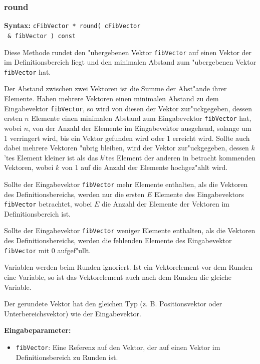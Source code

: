 \subsubsection{round}

\textbf{Syntax:} \verb|cFibVector * round( cFibVector| \\\verb| & fibVector ) const|

\bigskip\noindent
Diese Methode rundet den "ubergebenen Vektor \verb|fibVector| auf einen Vektor der im Definitionsbereich liegt und den minimalen Abstand zum "ubergebenen Vektor \verb|fibVector| hat.

Der Abstand zwischen zwei Vektoren ist die Summe der Abst"ande ihrer Elemente. Haben mehrere Vektoren einen minimalen Abstand zu dem Eingabevektor \verb|fibVector|, so wird von diesen der Vektor zur"uckgegeben, dessen ersten $n$ Elemente einen minimalen Abstand zum Eingabevektor \verb|fibVector| hat, wobei $n$, von der Anzahl der Elemente im Eingabevektor ausgehend, solange um 1 verringert wird, bis ein Vektor gefunden wird oder 1 erreicht wird. Sollte auch dabei mehrere Vektoren "ubrig bleiben, wird der Vektor zur"uckgegeben, dessen $k$'tes Element kleiner ist als das $k$'tes Element der anderen in betracht kommenden Vektoren, wobei $k$ von 1 auf die Anzahl der Elemente hochgez"ahlt wird.

Sollte der Eingabevektor \verb|fibVector| mehr Elemente enthalten, als die Vektoren des Definitionsbereichs, werden nur die ersten $E$ Elemente des Eingabevektors \verb|fibVector| betrachtet, wobei $E$ die Anzahl der Elemente der Vektoren im Definitionsbereich ist.

Sollte der Eingabevektor \verb|fibVector| weniger Elemente enthalten, als die Vektoren des Definitionsbereichs, werden die fehlenden Elemente des Eingabevektor \verb|fibVector| mit $0$ aufgef"ullt.

Variablen werden beim Runden ignoriert. Ist ein Vektorelement vor dem Runden eine Variable, so ist das Vektorelement auch nach dem Runden die gleiche Variable.

Der gerundete Vektor hat den gleichen Typ (z. B. Positionsvektor oder Unterbereichsvektor) wie der Eingabevektor.

\bigskip\noindent
\textbf{Eingabeparameter:}
\begin{itemize}
 \item \verb|fibVector|: Eine Referenz auf den Vektor, der auf einen Vektor im Definitionsbereich zu Runden ist.
\end{itemize}

